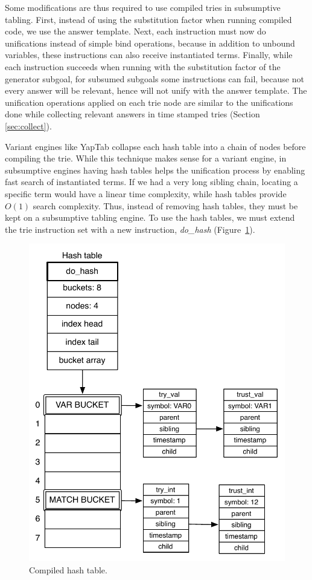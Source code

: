 Some modifications are thus required to use compiled tries in subsumptive tabling. First,
instead of using the substitution factor when running compiled code, we use the answer template.
Next, each instruction must now do unifications instead of simple bind operations,
because in addition to unbound variables, these instructions can also receive instantiated terms.
Finally, while each instruction succeeds when running with the substitution factor of the generator
subgoal, for subsumed subgoals some instructions can fail, because not every answer will be relevant,
hence will not unify with the answer template. The unification operations applied on each trie node
are similar to the unifications done while collecting relevant answers in time stamped tries
(Section \ref{sec:collect}).

Variant engines like YapTab collapse each hash table into a chain of nodes before compiling
the trie. While this technique makes sense for a variant engine, in subsumptive engines
having hash tables helps the unification process by enabling fast search of instantiated terms.
If we had a very long sibling chain, locating a specific term would have a linear time complexity, while
hash tables provide $O(1)$ search complexity.
Thus, instead of removing hash tables, they must be kept on a subsumptive tabling engine.
To use the hash tables, we must extend the trie instruction set with a new instruction,
\textit{do\_hash} (Figure~\ref{fig:compiled_hash}).

\begin{figure}[H]
  \centering
    \includegraphics[scale=0.6]{compiled_hash.pdf}
  \caption{Compiled hash table.}
  \label{fig:compiled_hash}
\end{figure}

